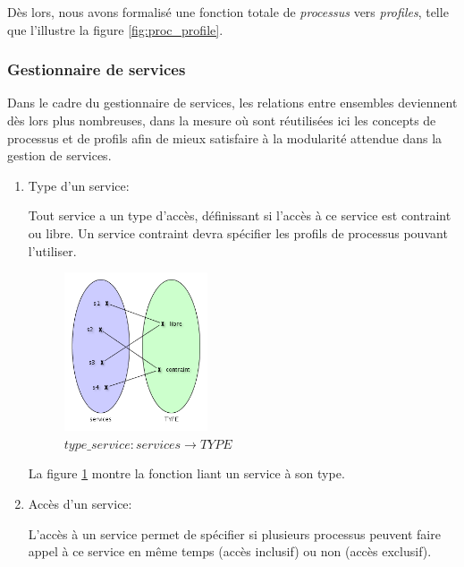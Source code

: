 \documentclass[french, titlepage, 10pt, a4paper]{article}
\begin{document}
Dès lors, nous avons formalisé une fonction totale de \emph{processus} vers
\emph{profiles}, telle que l'illustre la figure \ref{fig:proc_profile}.

\subsubsection{Gestionnaire de services}

Dans le cadre du gestionnaire de services, les relations entre ensembles
deviennent dès lors plus nombreuses, dans la mesure où sont réutilisées ici les
concepts de processus et de profils afin de mieux satisfaire à la modularité
attendue dans la gestion de services.

\begin{enumerate}

  \item Type d'un service:

    Tout service a un type d'accès, définissant si l'accès à ce service est
    contraint ou libre.
    Un service contraint devra spécifier les profils de processus pouvant
    l'utiliser.

    \begin{figure}[htb]
      \centering
      \includegraphics[width=0.4\textwidth]{type_service.png}
      \caption{$type\_service: services \rightarrow TYPE$}
      \label{fig:type_service}
    \end{figure}

    La figure \ref{fig:type_service} montre la fonction liant un service à son
    type.

  \item Accès d'un service:

    L'accès à un service permet de spécifier si plusieurs processus peuvent
    faire appel à ce service en même temps (accès inclusif) ou non (accès
    exclusif).


\end{enumerate}
\end{document}

